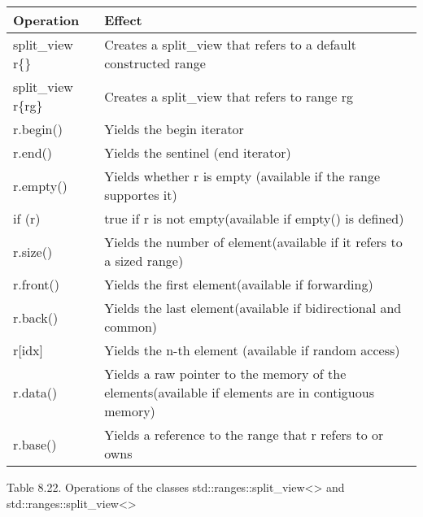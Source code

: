 \begin{longtable}[c]{|l|l|}
\hline
\textbf{Operation}  & \textbf{Effect}                                                 \\ \hline
\endfirsthead
%
\endhead
%
split\_view r\{\} & Creates a split\_view that refers to a default constructed range                                   \\ \hline
split\_view r\{rg\} & Creates a split\_view that refers to range rg                   \\ \hline
r.begin()           & Yields the begin iterator                                       \\ \hline
r.end()             & Yields the sentinel (end iterator)                              \\ \hline
r.empty()           & Yields whether r is empty (available if the range supportes it) \\ \hline
if (r)              & true if r is not empty(available if empty() is defined)         \\ \hline
r.size()          & Yields the number of element(available if it refers to a sized range)                              \\ \hline
r.front()           & Yields the first element(available if forwarding)               \\ \hline
r.back()            & Yields the last element(available if bidirectional and common)  \\ \hline
r{[}idx{]}          & Yields the n-th element (available if random access)            \\ \hline
r.data()          & Yields a raw pointer to the memory of the elements(available if elements are in contiguous memory) \\ \hline
r.base()            & Yields a reference to the range that r refers to or owns        \\ \hline
\end{longtable}

\begin{center}
Table 8.22. Operations of the classes std::ranges::split\_view<> and std::ranges::split\_view<>
\end{center}


